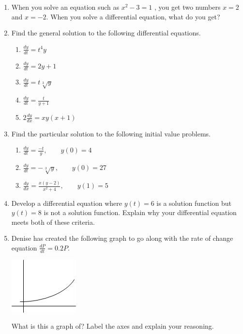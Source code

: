 \begin{enumerate}

\item When you solve an equation such as $x^2-3=1$ , you get two numbers $x=2$ and $x= -2$.  When you solve a differential equation, what do you get? \label{05HWproblem1}

\item Find the general solution to the following differential equations. \label{05HWproblem2}

\begin{enumerate}
\item $\displaystyle \frac{dy}{dt}=t^4y$
\item $\displaystyle \frac{dy}{dt}=2y+1$
\item $\displaystyle \frac{dy}{dt}=t\sqrt[3]{y}$
\item $\displaystyle \frac{dy}{dt}=\frac{t}{y+1}$
 \item $\displaystyle 2\frac{dy}{dx}=xy(x+1)$
\end{enumerate}
	 
\item	Find the particular solution to the following initial value problems. \label{05HWproblem3}
\begin{enumerate}
\item $\displaystyle \frac{dy}{dt}=\frac{-t}{y}, \qquad y(0)=4$
\item $\displaystyle \frac{dy}{dt}=-\sqrt[3]{y}, \qquad y(0)=27$
\item $\displaystyle \frac{dy}{dx}=\frac{x(y-2)}{x^2+4}, \qquad y(1)=5$
\end{enumerate}
	 
\item	Develop a differential equation where $y(t) = 6$ is a solution function but $y(t) = 8$ is not a solution function. Explain why your differential equation meets both of these criteria. \label{05HWproblem4}

\item Denise has created the following graph to go along with the rate of change equation $\frac{dP}{dt}=0.2P$. \label{05HWproblem5}
\begin{center}
\includegraphics[]{05/05Denise.png}
\end{center}
What is this a graph of? Label the axes and explain your reasoning.


\end{enumerate}
